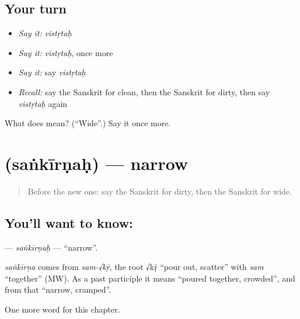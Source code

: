 \subsection*{Your turn}
\begin{itemize}
\raggedright
  \item \emph{Say it:} \emph{vistṛtaḥ}
  \item \emph{Say it:} \emph{vistṛtaḥ}, once more
  \item \emph{Say it:} say \emph{vistṛtaḥ}
  \item \emph{Recall:} say the Sanskrit for clean, then the Sanskrit for dirty, then say \emph{vistṛtaḥ} again
\end{itemize}

\begin{tcolorbox}[breakable,colback=teal!4,colframe=teal!35!black,title={Before you move on}]
What does  mean? (\textquotedblleft{}Wide\textquotedblright{}.) Say it once more.
\end{tcolorbox}
\section[\texorpdfstring{\sk{संकीर्णः} (saṅkīrṇaḥ)}{संकीर्णः (saṅkīrṇaḥ)}]{ (saṅkīrṇaḥ) — narrow}

\label{lesson:SA-C126-sankirnah}



\begin{quote}
Before the new one: say the Sanskrit for dirty, then the Sanskrit for wide.
\end{quote}

\subsection*{You'll want to know: }
\textbf{} — \emph{saṅkīrṇaḥ} — \textquotedblleft{}narrow\textquotedblright{}.

\begin{cousinweb}
\emph{saṅkīrṇa} comes from \emph{sam-√kṝ}, the root √kṝ \textquotedblleft{}pour out, scatter\textquotedblright{} with \emph{sam} \textquotedblleft{}together\textquotedblright{} (MW). As a past participle it means \textquotedblleft{}poured together, crowded\textquotedblright{}, and from that \textquotedblleft{}narrow, cramped\textquotedblright{}.
\end{cousinweb}

\begin{grammarlens}[title={What you've built}]
One more word for this chapter.
\end{grammarlens}

